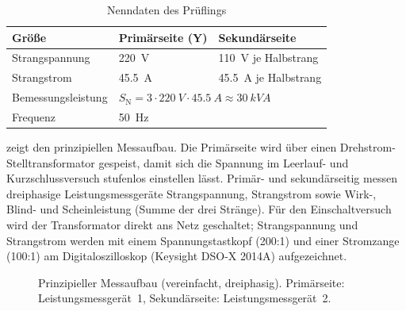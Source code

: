 \documentclass[a4paper,11pt]{scrreprt}
\begin{document}
\begin{table}[H]
\centering
\caption{Nenndaten des Prüflings}
\label{tab:nenndaten}
\begin{tabular}{@{}lll@{}}
\toprule
Größe & Primärseite (Y) & Sekundärseite\\
\midrule
Strangspannung & \SI{220}{V} & \SI{110}{V} je Halbstrang\\
Strangstrom & \SI{45.5}{A} & \SI{45.5}{A} je Halbstrang\\
Bemessungsleistung & \multicolumn{2}{l}{$S_\mathrm{N} = 3\cdot\SI{220}{V}\cdot\SI{45.5}{A} \approx \SI{30}{kVA}$}\\
Frequenz & \multicolumn{2}{l}{\SI{50}{Hz}}\\
\bottomrule
\end{tabular}
\end{table}

 zeigt den prinzipiellen Messaufbau. Die Primärseite wird über einen Drehstrom-Stelltransformator gespeist, damit sich die Spannung im Leerlauf- und Kurzschlussversuch stufenlos einstellen lässt. Primär- und sekundärseitig messen dreiphasige Leistungsmessgeräte Strangspannung, Strangstrom sowie Wirk-, Blind- und Scheinleistung (Summe der drei Stränge). Für den Einschaltversuch wird der Transformator direkt ans Netz geschaltet; Strangspannung und Strangstrom werden mit einem Spannungstastkopf (200:1) und einer Stromzange (100:1) am Digitaloszilloskop (Keysight DSO-X 2014A) aufgezeichnet.

\begin{figure}[H]
\centering
{}
\caption{Prinzipieller Messaufbau (vereinfacht, dreiphasig). Primärseite: Leistungsmessgerät~1, Sekundärseite: Leistungsmessgerät~2.}
\label{fig:aufbau}
\end{figure}
\end{document}
